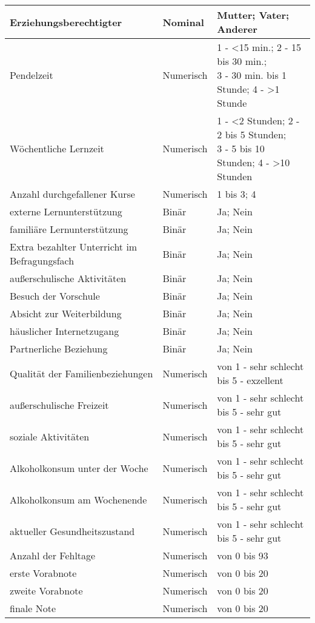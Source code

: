 \begin{table}[!ht]
\begin{tabular}{lll}
        Erziehungsberechtigter & Nominal & Mutter; Vater; Anderer \\  \hline
        Pendelzeit & Numerisch & \makecell[l]{1 - <15 min.; 2 - 15 bis 30 min.; \\3 - 30 min. bis 1 Stunde; 4 - >1 Stunde} \\  \hline
        Wöchentliche Lernzeit & Numerisch & \makecell[l]{1 - <2 Stunden; 2 - 2 bis 5 Stunden; \\3 - 5 bis 10 Stunden; 4 - >10 Stunden }\\  \hline
        Anzahl durchgefallener Kurse & Numerisch & 1 bis 3; 4 \\  \hline
        externe Lernunterstützung & Binär & Ja; Nein \\  \hline
        familiäre Lernunterstützung & Binär & Ja; Nein \\  \hline
        Extra bezahlter Unterricht im Befragungsfach & Binär & Ja; Nein \\  \hline
        außerschulische Aktivitäten & Binär & Ja; Nein \\  \hline
        Besuch der Vorschule & Binär & Ja; Nein \\  \hline
        Absicht zur Weiterbildung & Binär & Ja; Nein \\ \hline
        häuslicher Internetzugang & Binär & Ja; Nein \\ \hline
        Partnerliche Beziehung & Binär & Ja; Nein \\ \hline
        Qualität der Familienbeziehungen & Numerisch & von 1 - sehr schlecht bis 5 - exzellent\\ \hline
        außerschulische Freizeit & Numerisch & von 1 - sehr schlecht bis 5 - sehr gut \\ \hline
        soziale Aktivitäten & Numerisch & von 1 - sehr schlecht bis 5 - sehr gut \\ \hline
        Alkoholkonsum unter der Woche & Numerisch & von 1 - sehr schlecht bis 5 - sehr gut \\ \hline
        Alkoholkonsum am Wochenende & Numerisch & von 1 - sehr schlecht bis 5 - sehr gut \\ \hline
        aktueller Gesundheitszustand & Numerisch & von 1 - sehr schlecht bis 5 - sehr gut\\ \hline
        Anzahl der Fehltage & Numerisch & von 0 bis 93 \\ \hline
        erste Vorabnote & Numerisch & von 0 bis 20 \\ \hline
        zweite Vorabnote & Numerisch & von 0 bis 20 \\ \hline
        finale Note & Numerisch & von 0 bis 20 \\ \hline
    \hline
    \end{tabular}
\end{table}

